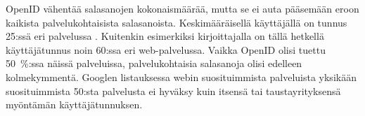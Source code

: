 \documentclass[english,gradu]{tktltiki}
\begin{document}
OpenID vähentää salasanojen kokonaismäärää, mutta se ei auta pääsemään eroon kaikista palvelukohtaisista
salasanoista. Keskimääräisellä käyttäjällä on tunnus 25:ssä eri palvelussa \cite{study_of_passwords_07}.
Kuitenkin esimerkiksi kirjoittajalla on tällä hetkellä käyttäjätunnus noin 60:ssa eri web-palvelussa. Vaikka
OpenID olisi tuettu 50~\%:ssa näissä palveluissa, palvelukohtaisia salasanoja olisi edelleen kolmekymmentä.
Googlen listauksessa webin suosituimmista palveluista \cite{google_top1000_sites} yksikään suosituimmista
50:sta palvelusta ei hyväksy kuin itsensä tai taustayrityksensä myöntämän käyttäjätunnuksen.

%
%
%
%
%
\end{document}
